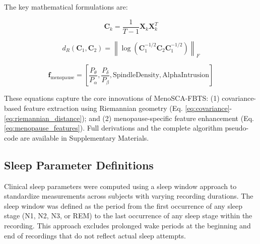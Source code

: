 \documentclass[a4paper,fleqn]{cas-dc}
\begin{document}
The key mathematical formulations are:

\begin{equation}
\mathbf{C}_k = \frac{1}{T-1} \mathbf{X}_k \mathbf{X}_k^T
\label{eq:covariance}
\end{equation}

\begin{equation}
d_R(\mathbf{C}_1, \mathbf{C}_2) = \left\| \log\left( \mathbf{C}_1^{-1/2} \mathbf{C}_2 \mathbf{C}_1^{-1/2} \right) \right\|_F
\label{eq:riemannian_distance}
\end{equation}

\begin{equation}
\mathbf{f}_{\text{menopause}} = \left[ \frac{P_{\theta}}{P_{\alpha}}, \frac{P_{\delta}}{P_{\beta}}, \text{SpindleDensity}, \text{AlphaIntrusion} \right]
\label{eq:menopause_features}
\end{equation}

These equations capture the core innovations of MenoSCA-FBTS: (1) covariance-based feature extraction using Riemannian geometry (Eq. \ref{eq:covariance}-\ref{eq:riemannian_distance}); and (2) menopause-specific feature enhancement (Eq. \ref{eq:menopause_features}). Full derivations and the complete algorithm pseudo-code are available in Supplementary Materials.

\subsection{Sleep Parameter Definitions}

Clinical sleep parameters were computed using a sleep window approach to standardize measurements across subjects with varying recording durations. The sleep window was defined as the period from the first occurrence of any sleep stage (N1, N2, N3, or REM) to the last occurrence of any sleep stage within the recording. This approach excludes prolonged wake periods at the beginning and end of recordings that do not reflect actual sleep attempts.
\end{document}
